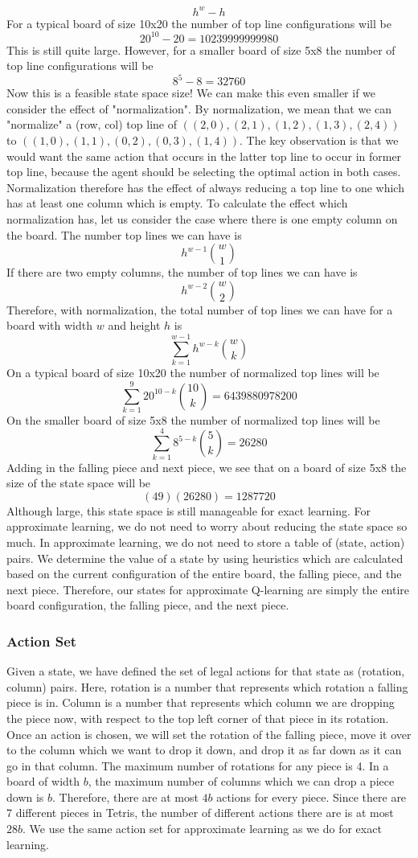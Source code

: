 \documentclass[10pt]{article}
\begin{document}
$$h^w - h$$
For a typical board of size 10x20 the number of top line configurations will be
$$20^{10} - 20 = 10239999999980$$
This is still quite large. However, for a smaller board of size 5x8 the number of top line configurations will be
$$8^5 - 8 = 32760$$
Now this is a feasible state space size! We can make this even smaller if we consider the effect of "normalization". By normalization, we mean that we can "normalize" a (row, col) top line of $((2,0),(2,1),(1,2),(1,3),(2,4))$ to $((1,0),(1,1),(0,2),(0,3),(1,4))$. The key observation is that we would want the same action that occurs in the latter top line to occur in former top line, because the agent should be selecting the optimal action in both cases. Normalization therefore has the effect of always reducing a top line to one which has at least one column which is empty. To calculate the effect which normalization has, let us consider the case where there is one empty column on the board. The number top lines we can have is
$$h^{w-1}\binom{w}{1}$$
If there are two empty columns, the number of top lines we can have is
$$h^{w-2}\binom{w}{2}$$
Therefore, with normalization, the total number of top lines we can have for a board with width $w$ and height $h$ is
$$\sum_{k=1}^{w-1}h^{w-k}\binom{w}{k}$$
On a typical board of size 10x20 the number of normalized top lines will be
$$\sum_{k=1}^{9} 20^{10-k}\binom{10}{k} = 6439880978200$$
On the smaller board of size 5x8 the number of normalized top lines will be
$$\sum_{k=1}^{4} 8^{5-k}\binom{5}{k} = 26280$$
Adding in the falling piece and next piece, we see that on a board of size 5x8 the size of the state space will be
$$(49)(26280) = 1287720$$
Although large, this state space is still manageable for exact learning. For approximate learning, we do not need to worry about reducing the state space so much. In approximate learning, we do not need to store a table of (state, action) pairs. We determine the value of a state by using heuristics which are calculated based on the current configuration of the entire board, the falling piece, and the next piece. Therefore, our states for approximate Q-learning are simply the entire board configuration, the falling piece, and the next piece.

\subsubsection{Action Set}
Given a state, we have defined the set of legal actions for that state as (rotation, column) pairs. Here, rotation is a number that represents which rotation a falling piece is in. Column is a number that represents which column we are dropping the piece now, with respect to the top left corner of that piece in its rotation. Once an action is chosen, we will set the rotation of the falling piece, move it over to the column which we want to drop it down, and drop it as far down as it can go in that column. The maximum number of rotations for any piece is 4. In a board of width $b$, the maximum number of columns which we can drop a piece down is  $b$. Therefore, there are at most $4b$ actions for every piece. Since there are 7 different pieces in Tetris, the number of different actions there are is at most $28b$. We use the same action set for approximate learning as we do for exact learning.
\end{document}
